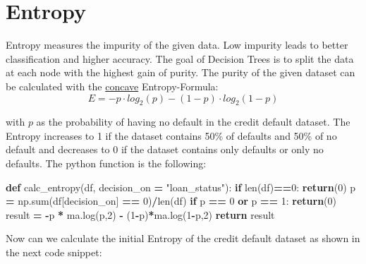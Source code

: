 \documentclass[
]{book}
\newenvironment{Shaded}{\begin{snugshade}}{\end{snugshade}}
\newcommand{\BuiltInTok}[1]{#1}
\newcommand{\ControlFlowTok}[1]{\textcolor[rgb]{0.13,0.29,0.53}{\textbf{#1}}}
\newcommand{\DecValTok}[1]{\textcolor[rgb]{0.00,0.00,0.81}{#1}}
\newcommand{\KeywordTok}[1]{\textcolor[rgb]{0.13,0.29,0.53}{\textbf{#1}}}
\newcommand{\NormalTok}[1]{#1}
\newcommand{\OperatorTok}[1]{\textcolor[rgb]{0.81,0.36,0.00}{\textbf{#1}}}
\newcommand{\StringTok}[1]{\textcolor[rgb]{0.31,0.60,0.02}{#1}}
\begin{document}
\hypertarget{entropy}{%
\section{Entropy}\label{entropy}}

Entropy measures the impurity of the given data. Low impurity leads to better classification and higher accuracy. The goal of Decision Trees is to split the data at each node with the highest gain of purity. The purity of the given dataset can be calculated with the \href{https://en.wikipedia.org/wiki/Concave_function}{concave} Entropy-Formula:
\[
  E = -p \cdot log_2(p) - (1-p) \cdot log_2(1-p) 
\]

with \(p\) as the probability of having no default in the credit default dataset. The Entropy increases to 1 if the dataset contains 50\% of defaults and 50\% of no default and decreases to 0 if the dataset contains only defaults or only no defaults. The python function is the following:

\begin{Shaded}
\begin{Highlighting}[]
\KeywordTok{def}\NormalTok{ calc\_entropy(df, decision\_on }\OperatorTok{=} \StringTok{"loan\_status"}\NormalTok{):}
  \ControlFlowTok{if} \BuiltInTok{len}\NormalTok{(df)}\OperatorTok{==}\DecValTok{0}\NormalTok{:}
    \ControlFlowTok{return}\NormalTok{(}\DecValTok{0}\NormalTok{)}
\NormalTok{  p }\OperatorTok{=}\NormalTok{ np.}\BuiltInTok{sum}\NormalTok{(df[decision\_on] }\OperatorTok{==} \DecValTok{0}\NormalTok{)}\OperatorTok{/}\BuiltInTok{len}\NormalTok{(df)}
  \ControlFlowTok{if}\NormalTok{ p }\OperatorTok{==} \DecValTok{0} \KeywordTok{or}\NormalTok{ p }\OperatorTok{==} \DecValTok{1}\NormalTok{:}
    \ControlFlowTok{return}\NormalTok{(}\DecValTok{0}\NormalTok{)}
\NormalTok{  result }\OperatorTok{=} \OperatorTok{{-}}\NormalTok{p }\OperatorTok{*}\NormalTok{ ma.log(p,}\DecValTok{2}\NormalTok{) }\OperatorTok{{-}}\NormalTok{ (}\DecValTok{1}\OperatorTok{{-}}\NormalTok{p)}\OperatorTok{*}\NormalTok{ma.log(}\DecValTok{1}\OperatorTok{{-}}\NormalTok{p,}\DecValTok{2}\NormalTok{)}
  \ControlFlowTok{return}\NormalTok{ result}
\end{Highlighting}
\end{Shaded}

Now can we calculate the initial Entropy of the credit default dataset as shown in the next code snippet:
\end{document}
